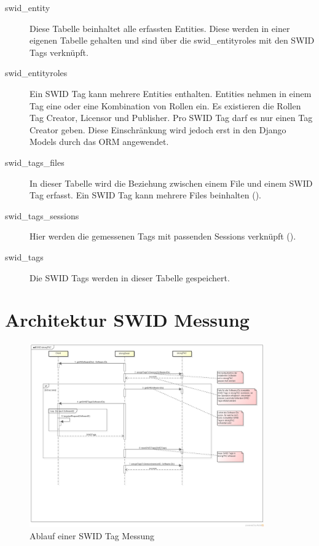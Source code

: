 \begin{description}
	
	\item[swid\_entity] Diese Tabelle beinhaltet alle erfassten Entities. Diese werden in einer eigenen Tabelle gehalten und sind über die swid\_entityroles
	mit den SWID Tags verknüpft.

	\item [swid\_entityroles] Ein SWID Tag kann mehrere Entities enthalten.
	Entities nehmen in einem Tag eine oder eine Kombination von Rollen ein. Es
	existieren die Rollen Tag Creator, Licensor und Publisher. Pro SWID Tag darf es
	nur einen Tag Creator geben. Diese Einschränkung wird jedoch erst in den Django
	Models durch das ORM angewendet.

	\item [swid\_tags\_files] In dieser Tabelle wird die Beziehung zwischen einem
	File und einem SWID Tag erfasst. Ein SWID Tag kann mehrere Files beinhalten
	().

	\item[swid\_tags\_sessions] Hier werden die gemessenen Tags mit passenden
	Sessions verknüpft ().
	
	\item[swid\_tags] Die SWID Tags werden in dieser Tabelle gespeichert.

\end{description}


\section{Architektur SWID Messung}

\begin{figure}[H]
	\centering
	\includegraphics[width=0.9\textwidth]{./images/architecture/SWID_strongTNC.png}
	\caption{Ablauf einer SWID Tag Messung}
	\label{fig:swid-measurement}
\end{figure}

